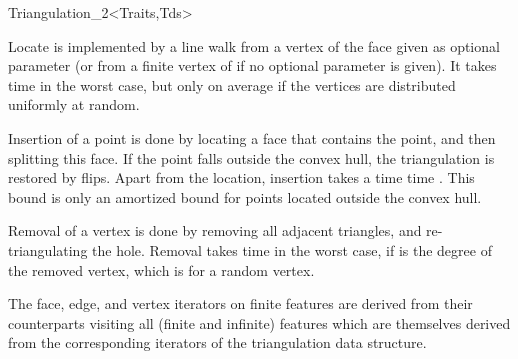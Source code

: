 \begin{ccRefClass}{Triangulation_2<Traits,Tds>}

Locate is implemented by a line walk from a vertex of the face given
as optional parameter (or from a finite vertex of
 if no optional parameter is given). It takes
time  in the worst case, but only 
on average if the vertices are distributed uniformly at random.

Insertion of a point is done by locating a face that contains the
point, and then splitting this face.
If the point falls outside the convex hull, the triangulation
 is restored by flips.  Apart from the location, insertion takes a time 
time . This bound is only an amortized bound
for points located outside the convex hull.

Removal of a vertex is done by removing all adjacent triangles, and
re-triangulating the hole. Removal takes time  in the worst
case, if  is the degree of the removed vertex,
which is  for a random vertex.

The face, edge, and vertex iterators on finite features
are derived from their counterparts visiting all (finite and infinite)
features which are themselves derived from the corresponding iterators
of the triangulation data structure.



\ccSeeAlso
{} \\
 \\
 \\
 \\
 \\
 \\





\end{ccRefClass}
\ccModifierCrossRefOn


